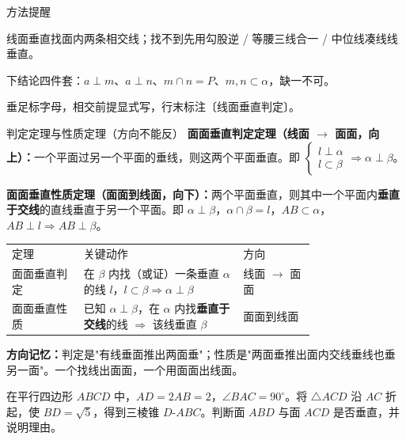 \documentclass{exam-zh}
\begin{document}
\begin{eduSummaryBlock}{\eduIconPin}{方法提醒}
\begin{eduBulletList}
  \item 线面垂直找面内两条相交线；找不到先用勾股逆 / 等腰三线合一 / 中位线凑线线垂直。  \item 下结论四件套：$a\perp m$、$a\perp n$、$m\cap n=P$、$m,n\subset\alpha$，缺一不可。  \item 垂足标字母，相交前提显式写，行末标注〔线面垂直判定〕。\end{eduBulletList}
\end{eduSummaryBlock}



\clearpage
{}


\begin{eduSolutionBox}{判定定理与性质定理（方向不能反）}
  \begingroup
  \setlength{\parskip}{2.5mm}
\textbf{面面垂直判定定理（线面 $\to$ 面面，向上）：}一个平面过另一个平面的垂线，则这两个平面垂直。即 $\begin{cases} l\perp\alpha \\ l\subset\beta \end{cases}\Rightarrow\alpha\perp\beta$。\par
\textbf{面面垂直性质定理（面面到线面，向下）：}两个平面垂直，则其中一个平面内\textbf{垂直于交线}的直线垂直于另一个平面。即 $\alpha\perp\beta$，$\alpha\cap\beta=l$，$AB\subset\alpha$，$AB\perp l\Rightarrow AB\perp\beta$。\par
\begin{tabular}{p{0.18\linewidth}p{0.40\linewidth}p{0.18\linewidth}}
定理 & 关键动作 & 方向\\
面面垂直判定 & 在 $\beta$ 内找（或证）一条垂直 $\alpha$ 的线 $l$，$l\subset\beta\Rightarrow\alpha\perp\beta$ & 线面 $\to$ 面面\\
面面垂直性质 & 已知 $\alpha\perp\beta$，在 $\alpha$ 内找\textbf{垂直于交线}的线 $\Rightarrow$ 该线垂直 $\beta$ & 面面到线面
\end{tabular}
\par
\textbf{方向记忆：}判定是"有线垂面推出两面垂"；性质是"两面垂推出面内交线垂线也垂另一面"。一个找线出面面，一个用面面出线面。\par
  \endgroup
\end{eduSolutionBox}




\begin{eduProblemBlock}[例题 2（面面垂直判定）]
在平行四边形 $ABCD$ 中，$AD=2AB=2$，$\angle BAC=90^{\circ}$。将 $\triangle ACD$ 沿 $AC$ 折起，使 $BD=\sqrt{5}$，得到三棱锥 $D\text{-}ABC$。判断面 $ABD$ 与面 $ACD$ 是否垂直，并说明理由。

\end{eduProblemBlock}
\end{document}
